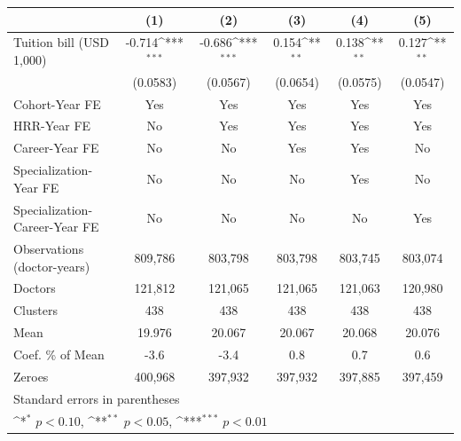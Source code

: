 {
\def\sym#1{\ifmmode^{#1}\else\(^{#1}\)\fi}
\begin{tabular}{l*{5}{c}}
\hline\hline
                    &\multicolumn{1}{c}{(1)}         &\multicolumn{1}{c}{(2)}         &\multicolumn{1}{c}{(3)}         &\multicolumn{1}{c}{(4)}         &\multicolumn{1}{c}{(5)}         \\
\hline
Tuition bill (USD 1,000)&      -0.714\sym{***}&      -0.686\sym{***}&       0.154\sym{**} &       0.138\sym{**} &       0.127\sym{**} \\
                    &    (0.0583)         &    (0.0567)         &    (0.0654)         &    (0.0575)         &    (0.0547)         \\
[1em]
Cohort-Year FE      &         Yes         &         Yes         &         Yes         &         Yes         &         Yes         \\
[1em]
HRR-Year FE         &          No         &         Yes         &         Yes         &         Yes         &         Yes         \\
[1em]
Career-Year FE      &          No         &          No         &         Yes         &         Yes         &          No         \\
[1em]
Specialization-Year FE&          No         &          No         &          No         &         Yes         &          No         \\
[1em]
Specialization-Career-Year FE&          No         &          No         &          No         &          No         &         Yes         \\
\hline
Observations (doctor-years)&     809,786         &     803,798         &     803,798         &     803,745         &     803,074         \\
Doctors             &     121,812         &     121,065         &     121,065         &     121,063         &     120,980         \\
Clusters            &         438         &         438         &         438         &         438         &         438         \\
Mean                &      19.976         &      20.067         &      20.067         &      20.068         &      20.076         \\
Coef. \% of Mean    &        -3.6         &        -3.4         &         0.8         &         0.7         &         0.6         \\
Zeroes              &     400,968         &     397,932         &     397,932         &     397,885         &     397,459         \\
\hline\hline
\multicolumn{6}{l}{\footnotesize Standard errors in parentheses}\\
\multicolumn{6}{l}{\footnotesize \sym{*} \(p<0.10\), \sym{**} \(p<0.05\), \sym{***} \(p<0.01\)}\\
\end{tabular}
}
